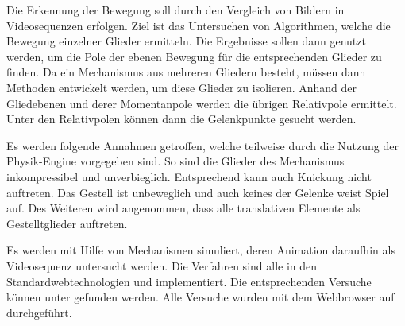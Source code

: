 Die Erkennung der Bewegung soll durch den Vergleich von Bildern in Videosequenzen erfolgen.
Ziel ist das Untersuchen von Algorithmen, welche die Bewegung einzelner Glieder ermitteln.
Die Ergebnisse sollen dann genutzt werden, um die Pole der ebenen Bewegung für die entsprechenden Glieder zu finden.
Da ein Mechanismus aus mehreren Gliedern besteht, müssen dann Methoden entwickelt werden, um diese Glieder zu isolieren.
Anhand der Gliedebenen und derer Momentanpole werden die übrigen Relativpole ermittelt.
Unter den Relativpolen können dann die Gelenkpunkte gesucht werden.

Es werden folgende Annahmen getroffen, welche teilweise durch die Nutzung der Physik-Engine  vorgegeben sind.
So sind die Glieder des Mechanismus inkompressibel und unverbieglich.
Entsprechend kann auch Knickung nicht auftreten.
Das Gestell ist unbeweglich und auch keines der Gelenke weist Spiel auf.
Des Weiteren wird angenommen, dass alle translativen Elemente als Gestelltglieder auftreten.

Es werden mit Hilfe von  Mechanismen simuliert, deren Animation daraufhin als Videosequenz untersucht werden.
Die Verfahren sind alle in den Standardwebtechnologien  und  implementiert.
Die entsprechenden Versuche können unter  gefunden werden.
Alle Versuche wurden mit dem Webbrowser  auf  durchgeführt.
